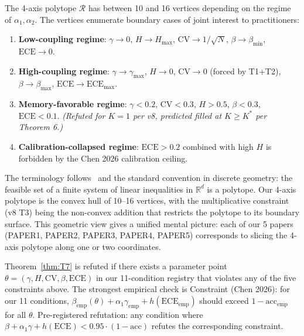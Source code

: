 \begin{corollary}
\label{cor:T7_vertices}
The 4-axis polytope $\mathcal{R}$ has between 10 and 16 vertices depending
on the regime of $\alpha_1, \alpha_2$. The vertices enumerate
boundary cases of joint interest to practitioners:
\begin{enumerate}[nosep,label=\textbf{V\arabic*:}]
  \item \textbf{Low-coupling regime}: $\gamma \to 0$, $H \to H_{\max}$,
        $\mathrm{CV} \to 1/\sqrt{N}$, $\beta \to \beta_{\min}$,
        $\mathrm{ECE} \to 0$.
  \item \textbf{High-coupling regime}: $\gamma \to \gamma_{\max}$,
        $H \to 0$, $\mathrm{CV} \to 0$ (forced by T1+T2),
        $\beta \to \beta_{\max}$, $\mathrm{ECE} \to \mathrm{ECE}_{\max}$.
  \item \textbf{Memory-favorable regime}: $\gamma < 0.2$,
        $\mathrm{CV} < 0.3$, $H > 0.5$, $\beta < 0.3$, $\mathrm{ECE} < 0.1$.
        \emph{(Refuted for $K=1$ per v8, predicted filled at $K \ge K^*$
        per Theorem 6.)}
  \item \textbf{Calibration-collapsed regime}: $\mathrm{ECE} > 0.2$ combined
        with high $H$ is forbidden by the Chen 2026 calibration ceiling.
\end{enumerate}
\end{corollary}

\begin{remark}
The terminology follows~\citet{ziegler1995} and the standard convention in
discrete geometry: the feasible set of a finite system of linear inequalities
in $\mathbb{R}^d$ is a polytope. Our 4-axis polytope is the convex hull of
10--16 vertices, with the multiplicative constraint (v8 T3) being the
non-convex addition that restricts the polytope to its boundary surface.
This geometric view gives a unified mental picture: each of our 5 papers
(PAPER1, PAPER2, PAPER3, PAPER4, PAPER5) corresponds to slicing the 4-axis
polytope along one or two coordinates.
\end{remark}

\begin{remark}
\label{rem:T7_falsification}
Theorem~\ref{thm:T7} is refuted if there exists a parameter point $\theta =
(\gamma, H, \mathrm{CV}, \beta, \mathrm{ECE})$ in our 11-condition registry
that violates any of the five constraints above. The strongest empirical
check is Constraint (Chen 2026): for our 11 conditions,
$\beta_{\mathrm{emp}}(\theta) + \alpha_1 \gamma_{\mathrm{emp}} +
h(\mathrm{ECE}_{\mathrm{emp}})$ should exceed $1 - \mathrm{acc}_{\mathrm{emp}}$
for all $\theta$. Pre-registered refutation: any condition where
$\beta + \alpha_1 \gamma + h(\mathrm{ECE}) < 0.95 \cdot (1 - \mathrm{acc})$
refutes the corresponding constraint.
\end{remark}

